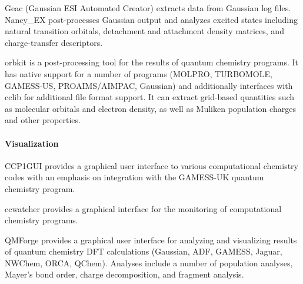 Geac (Gaussian ESI Automated Creator) extracts data from Gaussian log files. 
Nancy\_EX \cite{Etienne_2014} post-processes Gaussian output and analyzes excited states including natural transition orbitals, detachment and attachment density matrices, and charge-transfer descriptors.

orbkit \cite{hermann2016orbkit} is a post-processing tool for the results of quantum chemistry programs.  It has native support for a number of programs (MOLPRO, TURBOMOLE, GAMESS-US, PROAIMS/AIMPAC, Gaussian) and additionally interfaces with cclib for additional file format support.  It can extract grid-based quantities such as molecular orbitals and electron density, as well as Muliken population charges and other properties.


\paragraph{Visualization}
CCP1GUI provides a graphical user interface to various computational chemistry codes with an emphasis on integration with the GAMESS-UK quantum chemistry program.

ccwatcher provides a graphical interface for the monitoring of computational chemistry programs.

QMForge provides a graphical user interface for analyzing and visualizing results of quantum chemistry DFT calculations (Gaussian, ADF, GAMESS, Jaguar, NWChem, ORCA, QChem).  Analyses include a number of population analyses, Mayer's bond order, charge decomposition, and fragment analysis.
